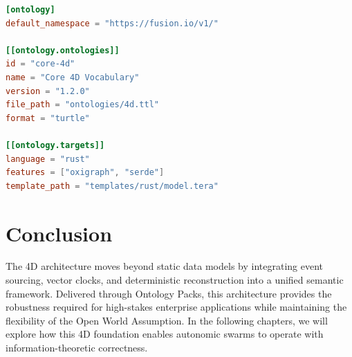 \begin{lstlisting}[language=toml, caption=Example Ontology Pack Configuration]
[ontology]
default_namespace = "https://fusion.io/v1/"

[[ontology.ontologies]]
id = "core-4d"
name = "Core 4D Vocabulary"
version = "1.2.0"
file_path = "ontologies/4d.ttl"
format = "turtle"

[[ontology.targets]]
language = "rust"
features = ["oxigraph", "serde"]
template_path = "templates/rust/model.tera"
\end{lstlisting}

\section{Conclusion}

The 4D architecture moves beyond static data models by integrating event sourcing, vector clocks, and deterministic reconstruction into a unified semantic framework. Delivered through Ontology Packs, this architecture provides the robustness required for high-stakes enterprise applications while maintaining the flexibility of the Open World Assumption. In the following chapters, we will explore how this 4D foundation enables autonomic swarms to operate with information-theoretic correctness.

